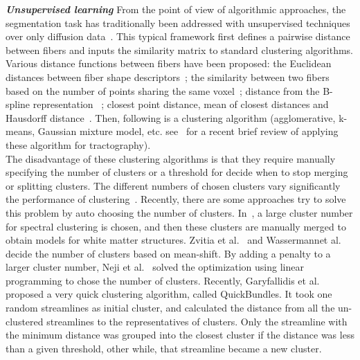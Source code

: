 \textbf{\textit{Unsupervised learning }}%
From the point of view of algorithmic approaches, the segmentation task has traditionally been addressed with unsupervised techniques over only diffusion data~\cite{zhang2008identifying}. This typical framework first defines a pairwise distance between fibers and inputs the similarity matrix to standard clustering algorithms. Various distance functions between fibers have been proposed: the Euclidean distances between fiber shape descriptors~\cite{brun2004clustering}; the similarity between two fibers based on the number of points sharing the same voxel~\cite{jonasson2005fiber}; distance from the B-spline representation~\cite{maddah2005automated} ; closest point distance, mean of closest distances and Hausdorff distance~\cite{gerig2004analysis}. Then, following is a clustering algorithm (agglomerative, k-means, Gaussian mixture model, etc. see~\cite{wang2011tractography} for a recent brief review of applying these algorithm for tractography).
\\The disadvantage of these clustering algorithms is that they require manually specifying the number of clusters or a threshold for decide when to stop merging or splitting clusters. The different numbers of chosen clusters vary significantly the performance of clustering~\cite{moberts2005evaluation}. 
Recently, there are some approaches try to solve this problem by auto choosing the number of clusters. In~\cite{odonnell2007automatic}, a large cluster number for spectral clustering is chosen, and then these clusters are manually merged to obtain models for white matter structures. Zvitia et al.~\cite{zvitia2008adaptive} and Wassermannet al.~\cite{wassermann2010unsupervised} decide the number of clusters based on mean-shift. %
By adding a penalty to a larger cluster number, Neji et al.~\cite{neji2009clustering} solved the optimization using linear programming to chose the number of clusters. Recently, Garyfallidis et al.~\cite{garyfallidis2012quickbundles} proposed a very quick clustering algorithm, called QuickBundles. It took one random streamlines as initial cluster, and calculated the distance from all the un-clustered streamlines to the representatives of clusters. Only the streamline with the minimum distance was grouped into the closest cluster if the distance was less than a given threshold, other while, that streamline became a new cluster. 
